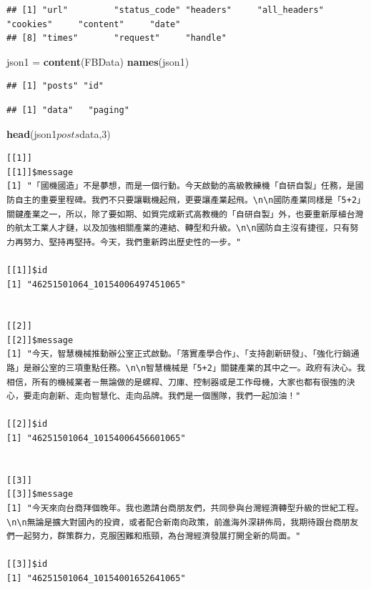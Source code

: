 \documentclass[]{book}
\newenvironment{Shaded}{\begin{snugshade}}{\end{snugshade}}
\newcommand{\KeywordTok}[1]{\textcolor[rgb]{0.13,0.29,0.53}{\textbf{{#1}}}}
\newcommand{\DecValTok}[1]{\textcolor[rgb]{0.00,0.00,0.81}{{#1}}}
\newcommand{\StringTok}[1]{\textcolor[rgb]{0.31,0.60,0.02}{{#1}}}
\newcommand{\NormalTok}[1]{{#1}}
\theoremstyle{definition}
\theoremstyle{definition}
\theoremstyle{remark}
\begin{document}
\begin{verbatim}
## [1] "url"         "status_code" "headers"     "all_headers" "cookies"     "content"     "date"       
## [8] "times"       "request"     "handle"    
\end{verbatim}

\begin{Shaded}
\begin{Highlighting}[]
\NormalTok{json1 =}\StringTok{ }\KeywordTok{content}\NormalTok{(FBData)}
\KeywordTok{names}\NormalTok{(json1)}
\end{Highlighting}
\end{Shaded}

\begin{verbatim}
## [1] "posts" "id"
\end{verbatim}

\begin{Shaded}
\end{Shaded}

\begin{verbatim}
## [1] "data"   "paging"
\end{verbatim}

\begin{Shaded}
\begin{Highlighting}[]
\KeywordTok{head}\NormalTok{(json1$posts$data,}\DecValTok{3}\NormalTok{)}
\end{Highlighting}
\end{Shaded}

\begin{verbatim}
[[1]]
[[1]]$message
[1] "「國機國造」不是夢想，而是一個行動。今天啟動的高級教練機「自研自製」任務，是國防自主的重要里程碑。我們不只要讓戰機起飛，更要讓產業起飛。\n\n國防產業同樣是「5+2」關鍵產業之一，所以，除了要如期、如質完成新式高教機的「自研自製」外，也要重新厚植台灣的航太工業人才鏈，以及加強相關產業的連結、轉型和升級。\n\n國防自主沒有捷徑，只有努力再努力、堅持再堅持。今天，我們重新跨出歷史性的一步。"

[[1]]$id
[1] "46251501064_10154006497451065"


[[2]]
[[2]]$message
[1] "今天，智慧機械推動辦公室正式啟動。「落實產學合作」、「支持創新研發」、「強化行銷通路」是辦公室的三項重點任務。\n\n智慧機械是「5+2」關鍵產業的其中之一。政府有決心。我相信，所有的機械業者－無論做的是螺桿、刀庫、控制器或是工作母機，大家也都有很強的決心，要走向創新、走向智慧化、走向品牌。我們是一個團隊，我們一起加油！"

[[2]]$id
[1] "46251501064_10154006456601065"


[[3]]
[[3]]$message
[1] "今天來向台商拜個晚年。我也邀請台商朋友們，共同參與台灣經濟轉型升級的世紀工程。\n\n無論是擴大對國內的投資，或者配合新南向政策，前進海外深耕佈局，我期待跟台商朋友們一起努力，群策群力，克服困難和瓶頸，為台灣經濟發展打開全新的局面。"

[[3]]$id
[1] "46251501064_10154001652641065"
\end{verbatim}
\end{document}
